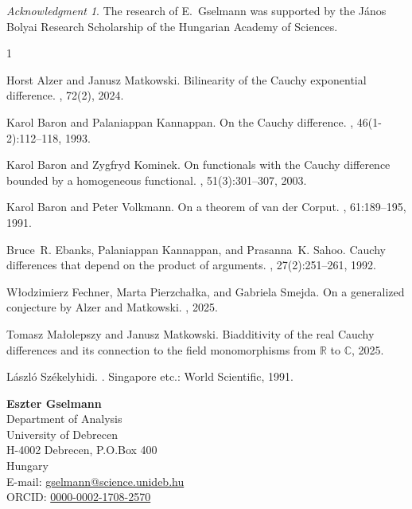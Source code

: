\documentclass[a4paper,12pt]{article}
\theoremstyle{plain}
\theoremstyle{definition}
\theoremstyle{remark}
\newtheorem*{ackn}{Acknowledgment}
\begin{document}
\begin{ackn}
The research of E.~Gselmann  was supported by the János Bolyai Research Scholarship of the Hungarian Academy of Sciences. 
\end{ackn}





%
%

\begin{thebibliography}{1}

Horst Alzer and Janusz Matkowski.
\newblock Bilinearity of the {C}auchy exponential difference.
, 72(2),
  2024.

Karol Baron and Palaniappan Kannappan.
\newblock On the {Cauchy} difference.
, 46(1-2):112--118, 1993.

Karol Baron and Zygfryd Kominek.
\newblock On functionals with the {Cauchy} difference bounded by a homogeneous
  functional.
, 51(3):301--307, 2003.

Karol Baron and Peter Volkmann.
\newblock On a theorem of van der {Corput}.
, 61:189--195, 1991.

Bruce~R. Ebanks, Palaniappan Kannappan, and Prasanna~K. Sahoo.
\newblock Cauchy differences that depend on the product of arguments.
, 27(2):251--261, 1992.

W{\l}odzimierz Fechner, Marta Pierzcha{\l}ka, and Gabriela Smejda.
\newblock On a generalized conjecture by {A}lzer and {M}atkowski.
, 2025.

Tomasz Małolepszy and Janusz Matkowski.
\newblock Biadditivity of the real {C}auchy differences and its connection to the
  field monomorphisms from $\mathbb{R}$ to $\mathbb{C}$, 2025.

L{\'a}szl{\'o} Sz{\'e}kelyhidi.
.
\newblock Singapore etc.: World Scientific, 1991.

\end{thebibliography}




\noindent
\textbf{Eszter Gselmann}\\
Department of Analysis\\
University of Debrecen\\
H-4002 Debrecen, P.O.Box 400\\
Hungary\\
E-mail: \href{mailto:gselmann@science.unideb.hu}{gselmann@science.unideb.hu}\\
ORCID: \href{https://orcid.org/0000-0002-1708-2570}{0000-0002-1708-2570}
\end{document}

